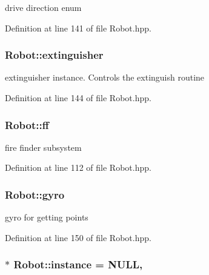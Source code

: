 drive direction enum 



Definition at line 141 of file Robot.\-hpp.

\hypertarget{classRobot_a506ec05fcf24208b486c48367b003e96}{
\subsubsection[{extinguisher}]{ Robot\-::extinguisher\hspace{0.3cm}{\ttfamily [private]}}}\label{classRobot_a506ec05fcf24208b486c48367b003e96}


extinguisher instance. Controls the extinguish routine 



Definition at line 144 of file Robot.\-hpp.

\hypertarget{classRobot_a342f5f8be2b5641eb3ae8f9c8475ebe6}{
\subsubsection[{ff}]{ Robot\-::ff}}\label{classRobot_a342f5f8be2b5641eb3ae8f9c8475ebe6}


fire finder subsystem 



Definition at line 112 of file Robot.\-hpp.

\hypertarget{classRobot_adafaf54e27eb3bd0cf08e32d7206e6a8}{
\subsubsection[{gyro}]{ Robot\-::gyro\hspace{0.3cm}{\ttfamily [private]}}}\label{classRobot_adafaf54e27eb3bd0cf08e32d7206e6a8}


gyro for getting points 



Definition at line 150 of file Robot.\-hpp.

\hypertarget{classRobot_aad5c5d6db601aac62393d47ec9385fa3}{
\subsubsection[{instance}]{ $\ast$ Robot\-::instance = N\-U\-L\-L\hspace{0.3cm}{\ttfamily [static]}, {\ttfamily [private]}}}\label{classRobot_aad5c5d6db601aac62393d47ec9385fa3}


